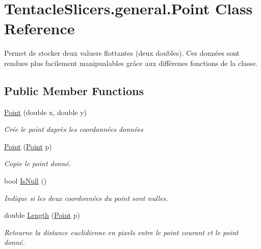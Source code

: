 \hypertarget{class_tentacle_slicers_1_1general_1_1_point}{}\section{Tentacle\+Slicers.\+general.\+Point Class Reference}
\label{class_tentacle_slicers_1_1general_1_1_point}


Permet de stocker deux valuers flottantes (deux doubles). Ces données sont rendues plus facilement manipualables grâce aux différenes fonctions de la classe.  


\subsection*{Public Member Functions}
\begin{DoxyCompactItemize}
\item 
\hyperlink{class_tentacle_slicers_1_1general_1_1_point_a151224e258dcc89d3c970de7104d7cf2}{Point} (double x, double y)
\begin{DoxyCompactList}\small\item\em Crée le point d\textquotesingle{}après les coordonnées données \end{DoxyCompactList}\item 
\hyperlink{class_tentacle_slicers_1_1general_1_1_point_a9a664c443df2dfd25840318a85c804e0}{Point} (\hyperlink{class_tentacle_slicers_1_1general_1_1_point}{Point} p)
\begin{DoxyCompactList}\small\item\em Copie le point donné. \end{DoxyCompactList}\item 
bool \hyperlink{class_tentacle_slicers_1_1general_1_1_point_a046c50bd6fdaf4f289ee8157851a2011}{Is\+Null} ()
\begin{DoxyCompactList}\small\item\em Indique si les deux coordonnées du point sont nulles. \end{DoxyCompactList}\item 
double \hyperlink{class_tentacle_slicers_1_1general_1_1_point_a78f6727f6e2594e6fd05858ef0fabb7a}{Length} (\hyperlink{class_tentacle_slicers_1_1general_1_1_point}{Point} p)
\begin{DoxyCompactList}\small\item\em Retourne la distance euclidienne en pixels entre le point courant et le point donné. \end{DoxyCompactList}\item 

\end{DoxyCompactItemize}

